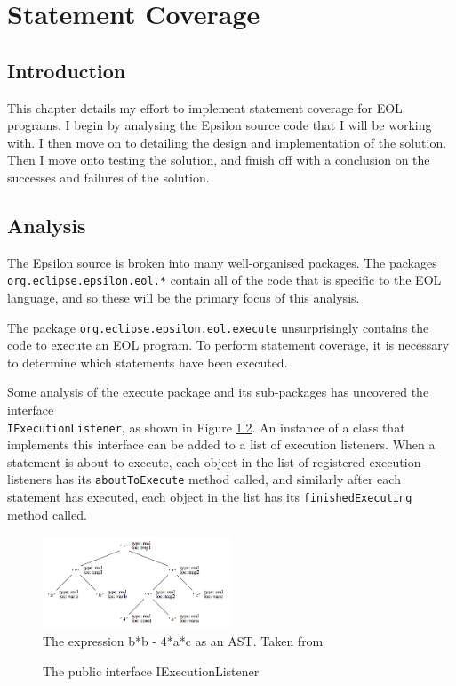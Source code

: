 \chapter{Statement Coverage}
\label{chap:statement}

\section{Introduction}

This chapter details my effort to implement statement coverage for EOL programs. I begin by analysing the Epsilon source code that I will be working with. I then move on to detailing the design and implementation of the solution. Then I move onto testing the solution, and finish off with a conclusion on the successes and failures of the solution.

\section{Analysis}

The Epsilon source is broken into many well-organised packages. The packages \\\verb+org.eclipse.epsilon.eol.*+ contain all of the code that is specific to the EOL language, and so these will be the primary focus of this analysis.

The package \verb+org.eclipse.epsilon.eol.execute+ unsurprisingly contains the code to execute an EOL program. To perform statement coverage, it is necessary to determine which statements have been executed. 

Some analysis of the execute package and its sub-packages has uncovered the interface \\\verb+IExecutionListener+, as shown in Figure \ref{lst:IExecutionListener}. An instance of a class that implements this interface can be added to a list of execution listeners. When a statement is about to execute, each object in the list of registered execution listeners has its \verb+aboutToExecute+ method called, and similarly after each statement has executed, each object in the list has its \verb+finishedExecuting+ method called.

\begin{figure}
\centering
\includegraphics[width=0.5\textwidth]{figures/AST.png}
\caption{The expression b*b - 4*a*c as an AST. Taken from \citep{grune2000modern}}
\label{fig:AST}
\end{figure}
\begin{figure}
	
	\caption{The public interface IExecutionListener}
	\label{lst:IExecutionListener}
\end{figure}

